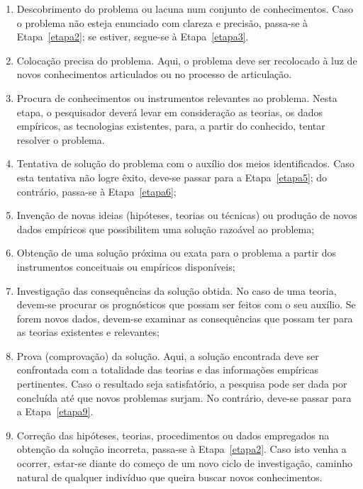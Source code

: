 \begin{enumerate}
\item \label{etapa1} Descobrimento do problema ou lacuna num conjunto de conhecimentos.  Caso o problema não esteja enunciado com clareza e precisão, passa-se à Etapa~\ref{etapa2}; se estiver, segue-se à Etapa~\ref{etapa3}.
\item \label{etapa2} Colocação precisa do problema. Aqui, o problema deve ser recolocado à luz de novos conhecimentos articulados ou no processo de articulação.
\item \label{etapa3} Procura de conhecimentos ou instrumentos relevantes ao problema.  Nesta etapa, o pesquisador deverá levar em consideração as teorias, os dados empíricos, as tecnologias existentes, para, a partir do conhecido, tentar resolver o problema. 
\item \label{etapa4} Tentativa de solução do problema com o auxílio dos meios identificados.  Caso esta tentativa não logre êxito, deve-se passar para a Etapa~\ref{etapa5}; do contrário, passa-se à Etapa~\ref{etapa6};
\item \label{etapa5} Invenção de novas ideias (hipóteses, teorias ou técnicas) ou produção de novos dados empíricos que possibilitem uma solução razoável ao problema;
\item \label{etapa6} Obtenção de uma solução próxima ou exata para o problema a partir dos instrumentos conceituais ou empíricos disponíveis;
\item \label{etapa7} Investigação das consequências da solução obtida. No caso de uma teoria, devem-se procurar os prognósticos que possam ser feitos com o seu auxílio. Se forem novos dados, devem-se examinar as consequências que possam ter para as teorias existentes e relevantes;
\item \label{etapa8} Prova (comprovação) da solução. Aqui, a solução encontrada deve ser confrontada com a totalidade das teorias e das informações empíricas pertinentes. Caso o resultado seja satisfatório, a pesquisa pode ser dada por concluída até que novos problemas surjam. No contrário, deve-se passar para a Etapa~\ref{etapa9}.
\item \label{etapa9} Correção das hipóteses, teorias, procedimentos ou dados empregados na obtenção da solução incorreta, passa-se à Etapa~\ref{etapa2}. Caso isto venha a ocorrer, estar-se diante do começo de um novo ciclo de investigação, caminho natural de qualquer indivíduo que queira buscar novos conhecimentos.
\end{enumerate}

